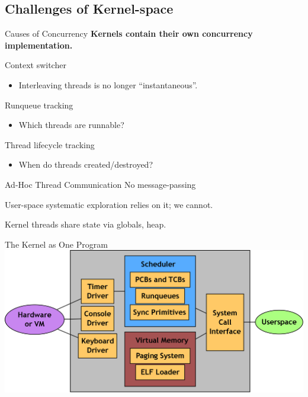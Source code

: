 \documentclass[xcolor=dvipsnames]{beamer}
\begin{document}
\subsection{Challenges of Kernel-space}

\begin{frame}{Causes of Concurrency} %
	\textbf{Kernels contain their own concurrency implementation.}

	\linegap
	Context switcher
	\begin{itemize}
		\item Interleaving threads is no longer ``instantaneous''.
	\end{itemize}
	Runqueue tracking
	\begin{itemize}
		\item Which threads are runnable?
	\end{itemize}
	Thread lifecycle tracking
	\begin{itemize}
		\item When do threads created/destroyed?
	\end{itemize}
\end{frame}

\begin{frame}{Ad-Hoc Thread Communication}
	No message-passing %
	
	User-space systematic exploration relies on it; we cannot.
	
	Kernel threads share state via globals, heap.
\end{frame}

\begin{frame}{The Kernel as One Program} %
	\includegraphics[width=\textwidth]{pebbles.png}
\end{frame}
\end{document}
